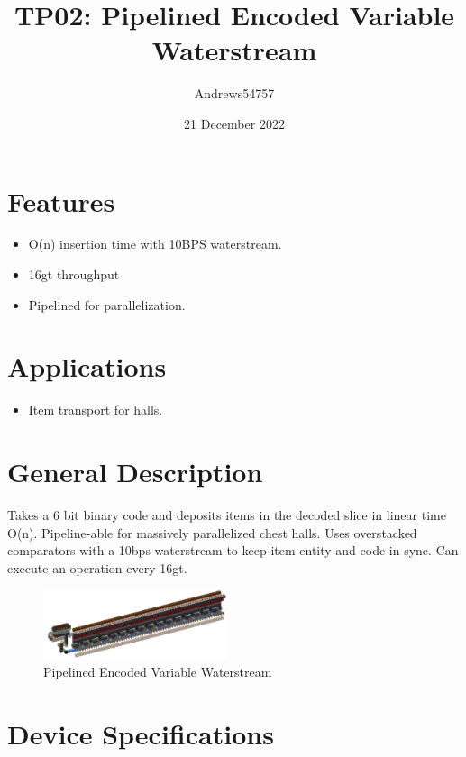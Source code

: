 \documentclass[10pt]{datasheet}
\title{TP02: Pipelined Encoded Variable Waterstream}
\author{Andrews54757}
\date{21 December 2022}
\begin{document}
\maketitle

\section{Features}

\begin{itemize}
\item{O(n) insertion time with 10BPS waterstream.}
\item{16gt throughput}
\item{Pipelined for parallelization.}
\end{itemize}

\section{Applications}

\begin{itemize}
\item{Item transport for halls.}
\end{itemize}

\section{General Description}
Takes a 6 bit binary code and deposits items in the decoded slice in linear time O(n). Pipeline-able for massively parallelized chest halls. Uses overstacked comparators with a 10bps waterstream to keep item entity and code in sync. Can execute an operation every 16gt.

\vfill\break

\begin{figure}[h]
    \centering
    \includegraphics[width=0.48\textwidth]{pipe.png}
    \caption{\centering Pipelined Encoded Variable Waterstream}
\end{figure}

\onecolumn

\section{Device Specifications}
\end{document}
